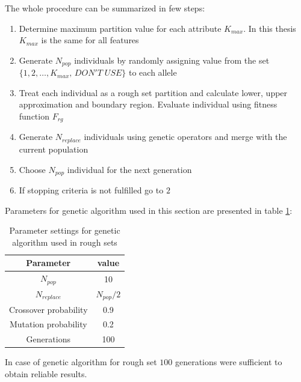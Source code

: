 The whole procedure can be summarized in few steps:
\begin{enumerate}
    \item Determine maximum partition value for each attribute $K_{max}$. In
        this thesis $K_{max}$ is the same for all features
    \item Generate $N_{pop}$ individuals by randomly assigning value from the
        set $\{1, 2, \ldots, K_{max}, \, DON'T\; USE\}$ to each allele
    \item Treat each individual as a rough set partition and calculate lower,
        upper approximation and boundary region. Evaluate individual using
        fitness function $F_{rg}$
    \item Generate $N_{replace}$ individuals using genetic operators and merge
        with the current population
    \item Choose $N_{pop}$ individual for the next generation
    \item If stopping criteria is not fulfilled go to $2$
\end{enumerate}
Parameters for genetic algorithm used in this section are presented in table
\ref{tab:rough_genetic_parameters}:
\begin{table}[H]
    \caption{Parameter settings for genetic algorithm used in rough sets}
    \centering
    \begin{tabular}{|c|c|}
        \hline
        Parameter & value \\ \hline \hline
        $N_{pop}$ & 10 \\ \hline
        $N_{replace}$ & $N_{pop}/2$ \\ \hline
        Crossover probability & 0.9 \\ \hline
        Mutation probability & 0.2 \\ \hline
        Generations & 100 \\ \hline
    \end{tabular}
    \label{tab:rough_genetic_parameters}
\end{table}
In case of genetic algorithm for rough set $100$ generations were sufficient to
obtain reliable results.
